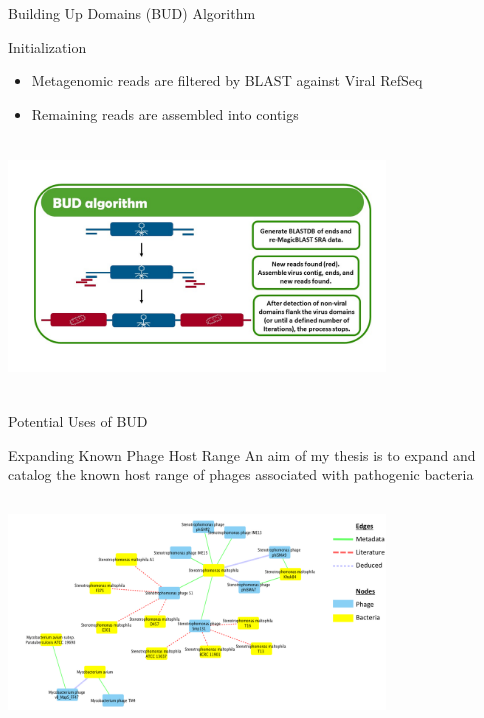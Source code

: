 \documentclass[11pt]{beamer}
\begin{document}
	
	\begin{frame}{Building Up Domains (BUD) Algorithm}
	\begin{block}{Initialization}
	\begin{itemize}
	\item Metagenomic reads are filtered by BLAST against Viral RefSeq
	\item Remaining reads are assembled into contigs
	\end{itemize}
	\end{block}
	\vspace{-0.5cm}
	\center
	\includegraphics[height=6.75cm, width=10cm]{BUD_Algorithm.jpg}
	
	\end{frame}
	
	\begin{frame}{Potential Uses of BUD	}

	\begin{block}{Expanding Known Phage Host Range}
	An aim of my thesis is to expand and catalog the known host range of phages associated with pathogenic bacteria 
	
	\includegraphics[height=6cm, width=10cm]{network.png}
	\end{block}
	
	\end{frame}
	
\end{document}
